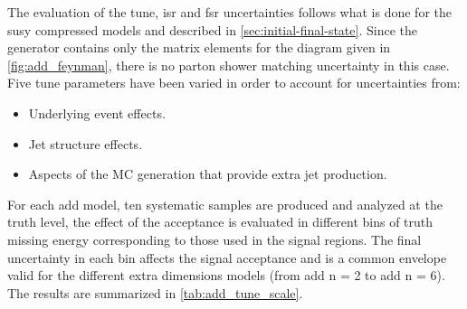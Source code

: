 The evaluation of the tune, \gls{isr} and \gls{fsr} uncertainties follows what
is done for the \gls{susy} compressed models and described in
\cref{sec:initial-final-state}. Since the generator contains only the matrix
elements for the diagram given in \cref{fig:add_feynman}, there is no parton
shower matching uncertainty in this case. Five tune parameters have been varied
in order to account for uncertainties from:
\begin{itemize}
\item Underlying event effects.
\item Jet structure effects.
\item Aspects of the MC generation that provide extra jet production.
\end{itemize}
For each \gls{add} model, ten systematic samples are produced and analyzed at
the truth level, the effect of the acceptance is evaluated in different bins of
truth missing energy corresponding to those used in the signal regions. The
final uncertainty in each bin affects the signal acceptance and is a common
envelope valid for the different extra dimensions models (from \gls{add} n = 2
to \gls{add} n = 6). The results are summarized in \cref{tab:add_tune_scale}.
\begin{table}[!ht]
  \centering
  \caption{Tune, initial and final state radiation uncertainties in \% on the
    acceptance of the different signal region $\met$ bins in the analysis. The
    final value is a common envelope valid for all the \gls{add} models between n = 2
    and n = 6 dimensions.}
  \label{tab:add_tune_scale}
\end{table}
